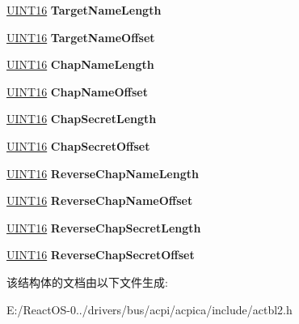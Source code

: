 \begin{DoxyCompactItemize}
\hyperlink{_processor_bind_8h_a09f1a1fb2293e33483cc8d44aefb1eb1}{U\+I\+N\+T16} {\bfseries Target\+Name\+Length}
\item 
\mbox{\label{structacpi__ibft__target_aa904dfdc0e9b33cbdb62f64ae6eb52e7}} 
\hyperlink{_processor_bind_8h_a09f1a1fb2293e33483cc8d44aefb1eb1}{U\+I\+N\+T16} {\bfseries Target\+Name\+Offset}
\item 
\mbox{\label{structacpi__ibft__target_adad6a519d11dc61289561c6608968b45}} 
\hyperlink{_processor_bind_8h_a09f1a1fb2293e33483cc8d44aefb1eb1}{U\+I\+N\+T16} {\bfseries Chap\+Name\+Length}
\item 
\mbox{\label{structacpi__ibft__target_a7f062887d9804f7fdebb509937e61876}} 
\hyperlink{_processor_bind_8h_a09f1a1fb2293e33483cc8d44aefb1eb1}{U\+I\+N\+T16} {\bfseries Chap\+Name\+Offset}
\item 
\mbox{\label{structacpi__ibft__target_a8051f0dc50ce17b4c13770e460314d36}} 
\hyperlink{_processor_bind_8h_a09f1a1fb2293e33483cc8d44aefb1eb1}{U\+I\+N\+T16} {\bfseries Chap\+Secret\+Length}
\item 
\mbox{\label{structacpi__ibft__target_a50fa063a4bc34bd1132eb2b5a74718b9}} 
\hyperlink{_processor_bind_8h_a09f1a1fb2293e33483cc8d44aefb1eb1}{U\+I\+N\+T16} {\bfseries Chap\+Secret\+Offset}
\item 
\mbox{\label{structacpi__ibft__target_aca65ca32b56ffd94a6e65abfde4e2bad}} 
\hyperlink{_processor_bind_8h_a09f1a1fb2293e33483cc8d44aefb1eb1}{U\+I\+N\+T16} {\bfseries Reverse\+Chap\+Name\+Length}
\item 
\mbox{\label{structacpi__ibft__target_a84038588d8c49da243aa1faf0ea350a0}} 
\hyperlink{_processor_bind_8h_a09f1a1fb2293e33483cc8d44aefb1eb1}{U\+I\+N\+T16} {\bfseries Reverse\+Chap\+Name\+Offset}
\item 
\mbox{\label{structacpi__ibft__target_ac9bfb22f8855f4c8f983db696d756755}} 
\hyperlink{_processor_bind_8h_a09f1a1fb2293e33483cc8d44aefb1eb1}{U\+I\+N\+T16} {\bfseries Reverse\+Chap\+Secret\+Length}
\item 
\mbox{\label{structacpi__ibft__target_a6f4557582d29e673c8e4dd649bcab195}} 
\hyperlink{_processor_bind_8h_a09f1a1fb2293e33483cc8d44aefb1eb1}{U\+I\+N\+T16} {\bfseries Reverse\+Chap\+Secret\+Offset}
\end{DoxyCompactItemize}


该结构体的文档由以下文件生成\+:\begin{DoxyCompactItemize}
\item 
E\+:/\+React\+O\+S-\/0../drivers/bus/acpi/acpica/include/actbl2.\+h\end{DoxyCompactItemize}

